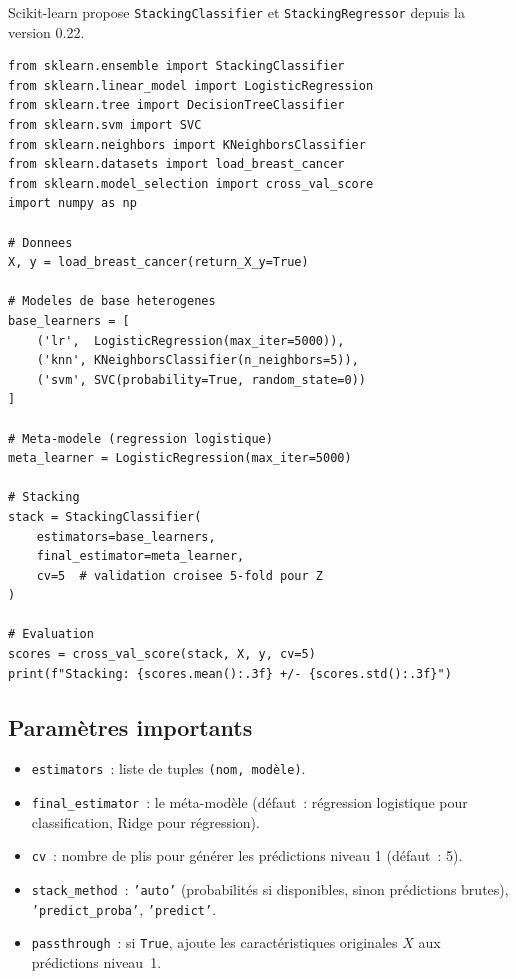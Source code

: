 \documentclass[a4paper,11pt]{article}
\theoremstyle{definition}
\theoremstyle{remark}
\begin{document}
Scikit-learn propose \texttt{StackingClassifier} et
\texttt{StackingRegressor} depuis la version 0.22.

\begin{lstlisting}
from sklearn.ensemble import StackingClassifier
from sklearn.linear_model import LogisticRegression
from sklearn.tree import DecisionTreeClassifier
from sklearn.svm import SVC
from sklearn.neighbors import KNeighborsClassifier
from sklearn.datasets import load_breast_cancer
from sklearn.model_selection import cross_val_score
import numpy as np

# Donnees
X, y = load_breast_cancer(return_X_y=True)

# Modeles de base heterogenes
base_learners = [
    ('lr',  LogisticRegression(max_iter=5000)),
    ('knn', KNeighborsClassifier(n_neighbors=5)),
    ('svm', SVC(probability=True, random_state=0))
]

# Meta-modele (regression logistique)
meta_learner = LogisticRegression(max_iter=5000)

# Stacking
stack = StackingClassifier(
    estimators=base_learners,
    final_estimator=meta_learner,
    cv=5  # validation croisee 5-fold pour Z
)

# Evaluation
scores = cross_val_score(stack, X, y, cv=5)
print(f"Stacking: {scores.mean():.3f} +/- {scores.std():.3f}")
\end{lstlisting}

\subsection{Param\`etres importants}

\begin{itemize}
  \item \texttt{estimators}~: liste de tuples \texttt{(nom, mod\`ele)}.
  \item \texttt{final\_estimator}~: le m\'eta-mod\`ele (d\'efaut~:
    r\'egression logistique pour classification, Ridge pour
    r\'egression).
  \item \texttt{cv}~: nombre de plis pour g\'en\'erer les
    pr\'edictions niveau 1 (d\'efaut~: 5).
  \item \texttt{stack\_method}~: \texttt{'auto'} (probabilit\'es si
    disponibles, sinon pr\'edictions brutes), \texttt{'predict\_proba'},
    \texttt{'predict'}.
  \item \texttt{passthrough}~: si \texttt{True}, ajoute les
    caract\'eristiques originales $X$ aux pr\'edictions niveau~1.
\end{itemize}
\end{document}

